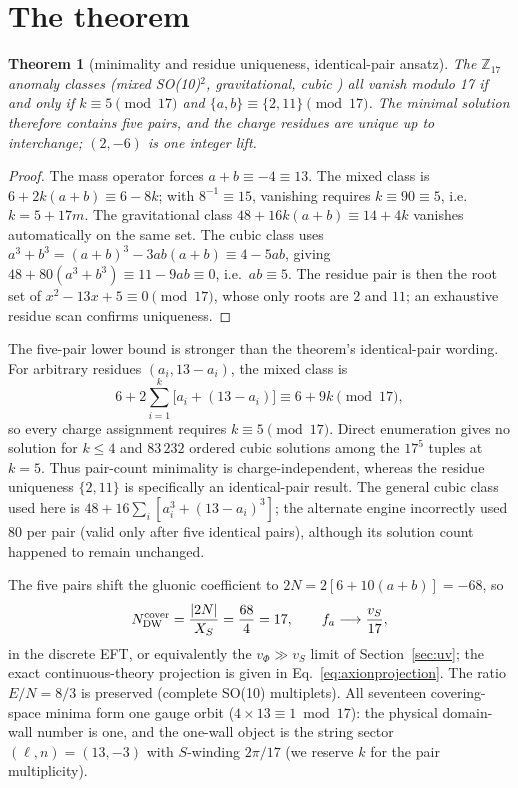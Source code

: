 \documentclass[11pt,a4paper]{article}
\newtheorem{theorem}{Theorem}
\newcommand{\fa}{f_a}
\newcommand{\Zs}{\mathbb{Z}_{17}}
\begin{document}
\section{The theorem}
\begin{theorem}[minimality and residue uniqueness, identical-pair ansatz]
The $\Zs$ anomaly classes (mixed SO(10)$^2$, gravitational, cubic
\cite{IR,Hsieh}) all vanish modulo 17 if and only if
$k \equiv 5 \pmod{17}$ and $\{a,b\} \equiv \{2,11\} \pmod{17}$. The
minimal solution therefore contains five pairs, and the charge
\emph{residues} are unique up to interchange; $(2,-6)$ is one integer
lift.
\end{theorem}

\begin{proof}
The mass operator forces $a + b \equiv -4 \equiv 13$. The mixed class
is $6 + 2k(a{+}b) \equiv 6 - 8k$; with $8^{-1} \equiv 15$, vanishing
requires $k \equiv 90 \equiv 5$, i.e.\ $k = 5 + 17m$. The gravitational
class $48 + 16k(a{+}b) \equiv 14 + 4k$ vanishes automatically on the
same set. The cubic class uses
$a^3 + b^3 = (a{+}b)^3 - 3ab(a{+}b) \equiv 4 - 5ab$, giving
$48 + 80(a^3{+}b^3) \equiv 11 - 9ab \equiv 0$, i.e.\ $ab \equiv 5$. The
residue pair is then the root set of $x^2 - 13x + 5 \equiv 0
\pmod{17}$, whose only roots are $2$ and $11$; an exhaustive residue
scan confirms uniqueness.
\end{proof}

The five-pair lower bound is stronger than the theorem's identical-pair
wording. For arbitrary residues $(a_i,13-a_i)$, the mixed class is
\begin{equation}
 6+2\sum_{i=1}^{k}\bigl[a_i+(13-a_i)\bigr]
 \equiv 6+9k\pmod{17},
\end{equation}
so every charge assignment requires $k\equiv5\pmod{17}$. Direct
enumeration gives no solution for $k\leq4$ and $83\,232$ ordered cubic
solutions among the $17^5$ tuples at $k=5$. Thus pair-count minimality is
charge-independent, whereas the residue uniqueness $\{2,11\}$ is
specifically an identical-pair result. The general cubic class used here is
$48+16\sum_i[a_i^3+(13-a_i)^3]$; the alternate engine incorrectly used
80 per pair (valid only after five identical pairs), although its solution
count happened to remain unchanged.

The five pairs shift the gluonic coefficient to
$2N = 2[6 + 10(a{+}b)] = -68$, so
\begin{equation}
N_{\rm DW}^{\rm cover} = \frac{|2N|}{X_S} = \frac{68}{4} = 17,
\qquad
\fa \longrightarrow \frac{v_S}{17},
\end{equation}
in the discrete EFT, or equivalently the $v_\Phi\gg v_S$ limit of
Section~\ref{sec:uv}; the exact continuous-theory projection is given in
Eq.~\eqref{eq:axionprojection}. The ratio $E/N = 8/3$ is preserved
(complete SO(10) multiplets). All seventeen
covering-space minima form one gauge orbit
($4\times13\equiv1\bmod17$): the physical domain-wall number is one,
and the one-wall object is the string sector $(\ell,n) = (13,-3)$ with
$S$-winding $2\pi/17$ (we reserve $k$ for the pair multiplicity).
\end{document}
